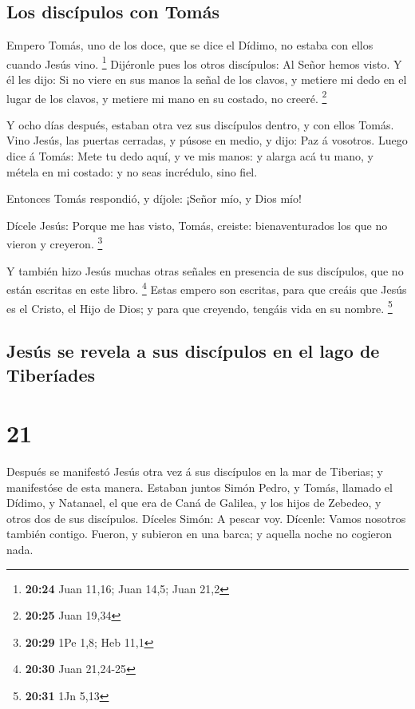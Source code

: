 \hypertarget{los-discuxedpulos-con-tomuxe1s}{%
\subsection{Los discípulos con
Tomás}\label{los-discuxedpulos-con-tomuxe1s}}

 Empero Tomás, uno de los doce, que se dice el Dídimo, no
estaba con ellos cuando Jesús vino. \footnote{\textbf{20:24} Juan 11,16;
  Juan 14,5; Juan 21,2}  Dijéronle pues los otros
discípulos: Al Señor hemos visto. Y él les dijo: Si no viere en sus
manos la señal de los clavos, y metiere mi dedo en el lugar de los
clavos, y metiere mi mano en su costado, no creeré. \footnote{\textbf{20:25}
  Juan 19,34}

 Y ocho días después, estaban otra vez sus discípulos
dentro, y con ellos Tomás. Vino Jesús, las puertas cerradas, y púsose en
medio, y dijo: Paz á vosotros.  Luego dice á Tomás: Mete
tu dedo aquí, y ve mis manos: y alarga acá tu mano, y métela en mi
costado: y no seas incrédulo, sino fiel.

 Entonces Tomás respondió, y díjole: ¡Señor mío, y Dios
mío!

 Dícele Jesús: Porque me has visto, Tomás, creiste:
bienaventurados los que no vieron y creyeron. \footnote{\textbf{20:29}
  1Pe 1,8; Heb 11,1}

 Y también hizo Jesús muchas otras señales en presencia
de sus discípulos, que no están escritas en este libro. \footnote{\textbf{20:30}
  Juan 21,24-25}  Estas empero son escritas, para que
creáis que Jesús es el Cristo, el Hijo de Dios; y para que creyendo,
tengáis vida en su nombre. \footnote{\textbf{20:31} 1Jn 5,13}

\hypertarget{jesuxfas-se-revela-a-sus-discuxedpulos-en-el-lago-de-tiberuxedades}{%
\subsection{Jesús se revela a sus discípulos en el lago de
Tiberíades}\label{jesuxfas-se-revela-a-sus-discuxedpulos-en-el-lago-de-tiberuxedades}}

\hypertarget{section-20}{%
\section{21}\label{section-20}}

 Después se manifestó Jesús otra vez á sus discípulos en
la mar de Tiberias; y manifestóse de esta manera.  Estaban
juntos Simón Pedro, y Tomás, llamado el Dídimo, y Natanael, el que era
de Caná de Galilea, y los hijos de Zebedeo, y otros dos de sus
discípulos.  Díceles Simón: A pescar voy. Dícenle: Vamos
nosotros también contigo. Fueron, y subieron en una barca; y aquella
noche no cogieron nada.

